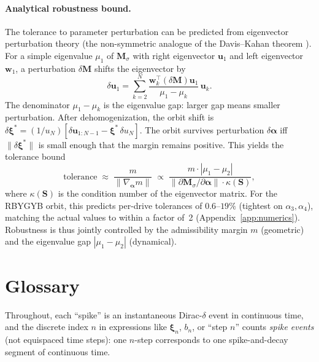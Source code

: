 \documentclass[12pt]{article}
\newcommand{\vv}[1]{\mathbf{#1}}
\newcommand{\xxi}{\boldsymbol{\xi}}
\begin{document}
\paragraph{Analytical robustness bound.} The tolerance to parameter perturbation can be predicted from eigenvector perturbation theory (the non-symmetric analogue of the Davis--Kahan theorem \citep{davis1970rotation,stewart1990matrix}). For a simple eigenvalue $\mu_1$ of $\vv{M}_\sigma$ with right eigenvector $\vv{u}_1$ and left eigenvector $\vv{w}_1$, a perturbation $\delta\vv{M}$ shifts the eigenvector by
\begin{equation}\label{eq:eigpert}
    \delta\vv{u}_1 = \sum_{k=2}^{N}\frac{\vv{w}_k^\top(\delta\vv{M})\vv{u}_1}{\mu_1-\mu_k}\,\vv{u}_k.
\end{equation}
The denominator $\mu_1-\mu_k$ is the eigenvalue gap: larger gap means smaller perturbation. After dehomogenization, the orbit shift is $\delta\xxi^*=(1/u_N)[\delta\vv{u}_{1:N-1}-\xxi^*\,\delta u_N]$. The orbit survives perturbation $\delta\boldsymbol{\alpha}$ iff $\|\delta\xxi^*\|$ is small enough that the margin remains positive. This yields the tolerance bound
\begin{equation}\label{eq:tolerance}
    \text{tolerance}\;\approx\;\frac{m}{\|\nabla_{\boldsymbol{\alpha}}m\|}\;\propto\;\frac{m\cdot|\mu_1-\mu_2|}{\|\partial\vv{M}_\sigma/\partial\boldsymbol{\alpha}\|\cdot\kappa(\vv{S})},
\end{equation}
where $\kappa(\vv{S})$ is the condition number of the eigenvector matrix. For the RBYGYB orbit, this predicts per-drive tolerances of $0.6$--$19\%$ (tightest on $\alpha_3,\alpha_4$), matching the actual values to within a factor of~2 (Appendix~\ref{app:numerics}). Robustness is thus jointly controlled by the admissibility margin $m$ (geometric) and the eigenvalue gap $|\mu_1-\mu_2|$ (dynamical).

\appendix
\section{Glossary}\label{sec:glossary}

Throughout, each ``spike'' is an instantaneous Dirac-$\delta$ event in continuous time, and the discrete index $n$ in expressions like $\xxi_n$, $b_n$, or ``step $n$'' counts \emph{spike events} (not equispaced time steps): one $n$-step corresponds to one spike-and-decay segment of continuous time.
\end{document}
